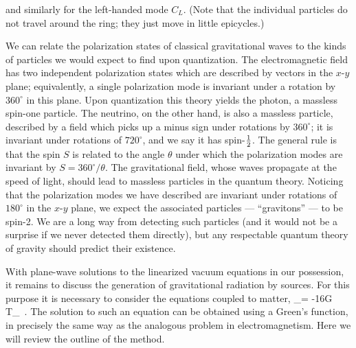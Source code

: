 \noindent and similarly for the left-handed mode $C_L$.  (Note
that the individual particles do not travel around the ring; they
just move in little epicycles.)

We can relate the polarization states of classical gravitational waves
to the kinds of particles we would expect to find upon 
quantization.  The electromagnetic field has two independent
polarization states which are described by vectors in
the $x$-$y$ plane; equivalently, a single polarization mode
is invariant under a rotation by $360^\circ$ in this plane.
Upon quantization this theory yields the photon, a massless
spin-one particle.  The neutrino, on the other hand, is also a 
massless particle, described by a field which picks up a
minus sign under rotations by $360^\circ$; it is invariant 
under rotations of $720^\circ$, and we say it has 
spin-${1\over 2}$.  The general rule is that the spin $S$ is
related to the angle $\theta$ under which the polarization modes
are invariant by $S=360^\circ/\theta$.
The gravitational field, whose waves
propagate at the speed of light, should lead to massless particles
in the quantum theory.  Noticing that the polarization modes we
have described are invariant under rotations of $180^\circ$ in
the $x$-$y$ plane, we expect the associated particles
--- ``gravitons'' --- to be
spin-2.  We are a long way from detecting such particles (and it
would not be a surprise if we never detected them directly), but any
respectable quantum theory of gravity should predict their existence.

With plane-wave solutions to the linearized vacuum equations in our
possession, it remains to discuss the generation of gravitational 
radiation by sources.  For this purpose it is necessary to consider
the equations coupled to matter, 
\be
  \boxx \bh_\mn = -16\pi G T_\mn\ .\label{6.70}
\ee
The solution to such an equation can be obtained using a
Green's function, in precisely the same way as the analogous problem
in electromagnetism.  Here we will review the outline of the method.

